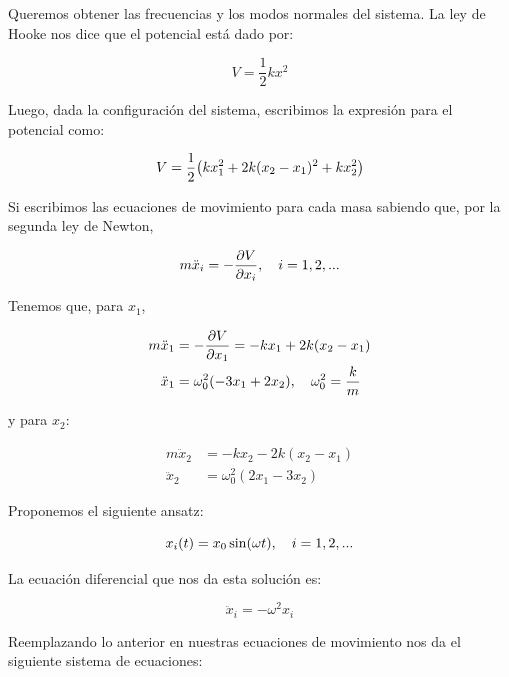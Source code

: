 \documentclass[11pt]{article}
\begin{document}
Queremos obtener las frecuencias y los modos normales del sistema. La ley de Hooke nos dice que el potencial está dado por:

\begin{equation}
    V = \frac{1}{2}kx^2
\end{equation}

Luego, dada la configuración del sistema, escribimos la expresión para el potencial como:

\begin{equation}
    V = \frac{1}{2}\pqty{kx_1^2 + 2k(x_2-x_1)^2 + kx_2^2}
\end{equation}

Si escribimos las ecuaciones de movimiento para cada masa sabiendo que, por la segunda ley de Newton,

\begin{equation}
    m\ddot{x}_i = -\pdv{V}{x_i} \qc i = 1,2,...
\end{equation}

Tenemos que, para $x_1$,

\begin{equation}
    \begin{aligned}
    m\ddot{x}_1 &= -\pdv{V}{x_1} = -kx_1 + 2k(x_2 - x_1)\\
    \ddot{x}_1 &= \omega_0^2(-3x_1 + 2x_2) \qc \omega_0^2 = \frac{k}{m}
    \end{aligned}
\end{equation}

y para $x_2$:

\begin{equation}
    \begin{aligned}
    m\ddot{x}_2 &= -kx_2 - 2k(x_2 - x_1)\\
    \ddot{x}_2 &= \omega_0^2(2x_1 - 3x_2)
    \end{aligned}
\end{equation}

Proponemos el siguiente ansatz:

\begin{equation}
    x_i(t) = x_0\sin(\omega t)\qc i=1,2,...
\end{equation}

La ecuación diferencial que nos da esta solución es:

\begin{equation}
    \ddot{x}_i = -\omega^2x_i
\end{equation}

Reemplazando lo anterior en nuestras ecuaciones de movimiento nos da el siguiente sistema de ecuaciones:
\end{document}
